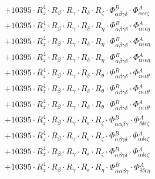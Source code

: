 \documentclass{article}
\begin{document}
\begin{subequations}
\begin{gather}
\begin{array}{c}
 \\[0.2em] 		 + 10395 \cdot R_{z}^{4} \cdot R_{\beta{}} \cdot R_{\gamma{}} \cdot R_{\delta{}} \cdot R_{\zeta{}} \cdot \Phi{}^{B}_{\alpha{}\beta{}\gamma{}\delta{}} \cdot \Phi{}^{A}_{\alpha{}\epsilon{}\epsilon{}\zeta{}} 
 \\[0.2em] 		 + 10395 \cdot R_{z}^{4} \cdot R_{\beta{}} \cdot R_{\gamma{}} \cdot R_{\delta{}} \cdot R_{\eta{}} \cdot \Phi{}^{B}_{\alpha{}\beta{}\gamma{}\delta{}} \cdot \Phi{}^{A}_{\alpha{}\epsilon{}\epsilon{}\eta{}} 
 \\[0.2em] 		 + 10395 \cdot R_{z}^{4} \cdot R_{\beta{}} \cdot R_{\gamma{}} \cdot R_{\delta{}} \cdot R_{\eta{}} \cdot \Phi{}^{B}_{\alpha{}\beta{}\gamma{}\delta{}} \cdot \Phi{}^{A}_{\alpha{}\epsilon{}\epsilon{}\eta{}} 
 \\[0.2em] 		 + 10395 \cdot R_{z}^{4} \cdot R_{\beta{}} \cdot R_{\gamma{}} \cdot R_{\delta{}} \cdot R_{\eta{}} \cdot \Phi{}^{B}_{\alpha{}\beta{}\gamma{}\delta{}} \cdot \Phi{}^{A}_{\alpha{}\epsilon{}\epsilon{}\eta{}} 
 \\[0.2em] 		 + 10395 \cdot R_{z}^{4} \cdot R_{\beta{}} \cdot R_{\gamma{}} \cdot R_{\delta{}} \cdot R_{\theta{}} \cdot \Phi{}^{B}_{\alpha{}\beta{}\gamma{}\delta{}} \cdot \Phi{}^{A}_{\alpha{}\epsilon{}\epsilon{}\theta{}} 
 \\[0.2em] 		 + 10395 \cdot R_{z}^{4} \cdot R_{\beta{}} \cdot R_{\gamma{}} \cdot R_{\delta{}} \cdot R_{\theta{}} \cdot \Phi{}^{B}_{\alpha{}\beta{}\gamma{}\delta{}} \cdot \Phi{}^{A}_{\alpha{}\epsilon{}\epsilon{}\theta{}} 
 \\[0.2em] 		 + 10395 \cdot R_{z}^{4} \cdot R_{\beta{}} \cdot R_{\gamma{}} \cdot R_{\delta{}} \cdot R_{\theta{}} \cdot \Phi{}^{B}_{\alpha{}\beta{}\gamma{}\delta{}} \cdot \Phi{}^{A}_{\alpha{}\epsilon{}\epsilon{}\theta{}} 
 \\[0.2em] 		 + 10395 \cdot R_{z}^{4} \cdot R_{\beta{}} \cdot R_{\gamma{}} \cdot R_{\epsilon{}} \cdot R_{\zeta{}} \cdot \Phi{}^{B}_{\alpha{}\alpha{}\beta{}\gamma{}} \cdot \Phi{}^{A}_{\delta{}\delta{}\epsilon{}\zeta{}} 
 \\[0.2em] 		 + 10395 \cdot R_{z}^{4} \cdot R_{\beta{}} \cdot R_{\gamma{}} \cdot R_{\epsilon{}} \cdot R_{\zeta{}} \cdot \Phi{}^{B}_{\alpha{}\beta{}\gamma{}\delta{}} \cdot \Phi{}^{A}_{\alpha{}\delta{}\epsilon{}\zeta{}} 
 \\[0.2em] 		 + 10395 \cdot R_{z}^{4} \cdot R_{\beta{}} \cdot R_{\gamma{}} \cdot R_{\epsilon{}} \cdot R_{\zeta{}} \cdot \Phi{}^{B}_{\alpha{}\beta{}\gamma{}\delta{}} \cdot \Phi{}^{A}_{\alpha{}\delta{}\epsilon{}\zeta{}} 
 \\[0.2em] 		 + 10395 \cdot R_{z}^{4} \cdot R_{\beta{}} \cdot R_{\gamma{}} \cdot R_{\epsilon{}} \cdot R_{\eta{}} \cdot \Phi{}^{B}_{\alpha{}\alpha{}\beta{}\gamma{}} \cdot \Phi{}^{A}_{\delta{}\delta{}\epsilon{}\eta{}} 

\end{array}
\end{gather}
\end{subequations}
\end{document}
